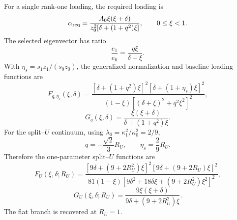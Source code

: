 For a single rank-one loading, the required loading is
\begin{equation}
\label{eq:app-stage040-alpha-req}
\alpha_{\rm req}=\frac{A_0\xi(\xi+\delta)}{z_0^2[\delta+(1+q^2)\xi]},
\qquad
0\leq\xi<1.
\end{equation}
The selected eigenvector has ratio
\begin{equation}
\label{eq:app-stage040-evec}
\frac{e_1}{e_0}=\frac{q\xi}{\delta+\xi}.
\end{equation}
With \(\eta_s=s_1z_1/(s_0z_0)\), the generalized normalization and baseline loading functions are
\begin{equation}
\label{eq:app-stage040-Fqeta}
\boxed{
F_{q,\eta_s}(\xi,\delta)
=\frac{[\delta+(1+q^2)\xi]^2[\delta+(1+\eta_s)\xi]^2}
{(1-\xi)[(\delta+\xi)^2+q^2\xi^2]^2}},
\end{equation}
\begin{equation}
\label{eq:app-stage040-Gq}
\boxed{
G_q(\xi,\delta)=\frac{\xi(\xi+\delta)}{\delta+(1+q^2)\xi}}.
\end{equation}
For the split--\(U\) continuum, using \(\lambda_0=\kappa_1^2/\kappa_0^2=2/9\),
\begin{equation}
\label{eq:app-stage040-qeta-RU}
q=-\frac{\sqrt2}{3}R_U,
\qquad
\eta_s=\frac{2}{9}R_U.
\end{equation}
Therefore the one-parameter split--\(U\) functions are
\begin{equation}
\label{eq:app-stage040-FU}
\boxed{
F_U(\xi,\delta;R_U)=
\frac{[9\delta+(9+2R_U^2)\xi]^2[9\delta+(9+2R_U)\xi]^2}
{81(1-\xi)[9\delta^2+18\delta\xi+(9+2R_U^2)\xi^2]^2}},
\end{equation}
\begin{equation}
\label{eq:app-stage040-GU}
\boxed{
G_U(\xi,\delta;R_U)=\frac{9\xi(\xi+\delta)}{9\delta+(9+2R_U^2)\xi}}.
\end{equation}
The flat branch is recovered at \(R_U=1\).


